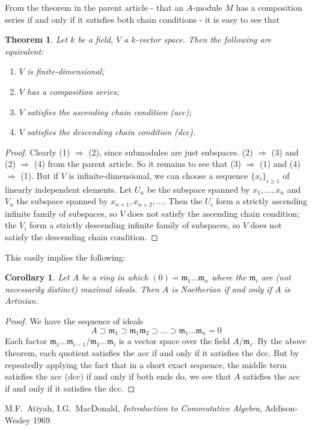\documentclass[12pt]{article}
\newtheorem{thm}{Theorem}
\newtheorem{cor}{Corollary}
\newcommand{\smm}{\mathfrak{m}}
\begin{document}
From the theorem in the parent article - that an $A$-module $M$ has a composition series if and only if it satisfies both chain conditions - it is easy to see that
\begin{thm} Let $k$ be a field, $V$ a $k$-vector space. Then the following are equivalent:
\begin{enumerate}
\item $V$ is finite-dimensional;
\item $V$ has a composition series;
\item $V$ satisfies the ascending chain condition (acc);
\item $V$ satisfies the descending chain condition (dcc).
\end{enumerate}
\end{thm}
\begin{proof}
Clearly (1) $\Rightarrow$ (2), since submodules are just subspaces. (2) $\Rightarrow$ (3) and (2) $\Rightarrow$ (4) from the parent article. So it remains to see that (3) $\Rightarrow$ (1) and (4) $\Rightarrow$ (1). But if $V$ is infinite-dimensional, we can choose a sequence $\{x_i\}_{i\ge 1}$ of linearly independent elements. Let $U_n$ be the subspace spanned by $x_1,\dotsc,x_n$ and $V_n$ the subspace spanned by $x_{n+1},x_{n+2},\dots$. Then the $U_i$ form a strictly ascending infinite family of subspaces, so $V$ does not satisfy the ascending chain condition; the $V_i$ form a strictly descending infinite family of subspaces, so $V$ does not satisfy the descending chain condition.
\end{proof}

This easily implies the following:
\begin{cor} Let $A$ be a ring in which $(0) = \smm_1\dots\smm_n$ where the $\smm_i$ are (not necessarily distinct) maximal ideals. Then $A$ is Noetherian if and only if $A$ is Artinian.
\end{cor}
\begin{proof} We have the sequence of ideals
\[
  A \supset \smm_1 \supset \smm_1\smm_2 \supset\dots\supset \smm_1\dots\smm_n = 0
\]
Each factor $\smm_1\dots\smm_{i-1}/\smm_1\dots\smm_i$ is a vector space over the field $A/\smm_i$. By the above theorem, each quotient satisfies the acc if and only if it satisfies the dcc. But by repeatedly applying the fact that in a short exact sequence, the middle term satisfies the acc (dcc) if and only if both ends do, we see that $A$ satisfies the acc if and only if it satisfies the dcc.
\end{proof}
\begin{thebibliography}{10}
M.F.~Atiyah, I.G.~MacDonald, \emph{Introduction to Commutative Algebra}, Addison-Wesley 1969.
\end{thebibliography}

\end{document}
